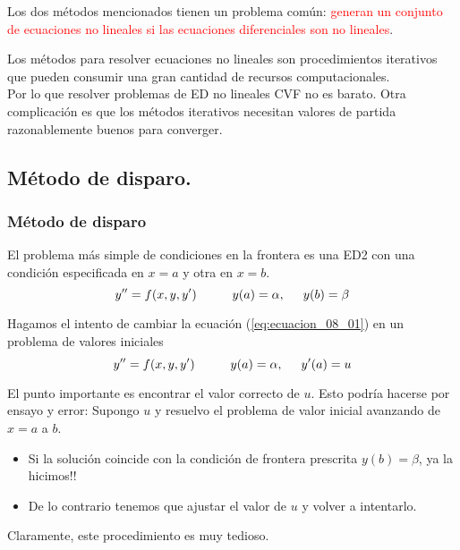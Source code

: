 \begin{frame}
Los dos métodos mencionados tienen un problema común: \textcolor{red}{generan un conjunto de ecuaciones no lineales si las ecuaciones diferenciales son no lineales}.
\end{frame}
\begin{frame}
Los métodos para resolver ecuaciones no lineales son procedimientos iterativos que pueden consumir una gran cantidad de recursos computacionales.
\\
\bigskip
Por lo que resolver problemas de ED no lineales CVF no es barato. Otra complicación es que los métodos iterativos necesitan valores de partida razonablemente buenos para converger. 
\end{frame}
\subsection{Método de disparo.}
\begin{frame}
\frametitle{Método de disparo}
El problema más simple de condiciones en la frontera es una ED2 con una condición especificada en $x = a$ y otra en $x = b$.
\begin{equation}
y^{\prime \prime} = f(x, y, y^{\prime}) \hspace{1cm} y(a) = \alpha, \hspace{0.5cm} y(b) = \beta
\label{eq:ecuacion_08_01}
\end{equation}
\end{frame}
\begin{frame}
Hagamos el intento de cambiar la ecuación (\ref{eq:ecuacion_08_01}) en un problema de valores iniciales
\begin{equation}
y^{\prime \prime} = f(x, y, y^{\prime}) \hspace{1cm} y(a) = \alpha, \hspace{0.5cm} y^{\prime}(a) = u
\label{eq:ecuacion_08_02}
\end{equation}
\end{frame}
\begin{frame}
El punto importante es encontrar el valor correcto de $u$. Esto podría hacerse por ensayo y error: Supongo $u$ y resuelvo el problema de valor inicial avanzando de $x = a$ a $b$.
\pause
\begin{itemize}[<+->]
\item Si la solución coincide con la condición de frontera prescrita $y(b) = \beta$, ya la hicimos!!
\item De lo contrario tenemos que ajustar el valor de $u$ y volver a intentarlo.
\end{itemize}
\pause
Claramente, este procedimiento es muy tedioso.
\end{frame}

